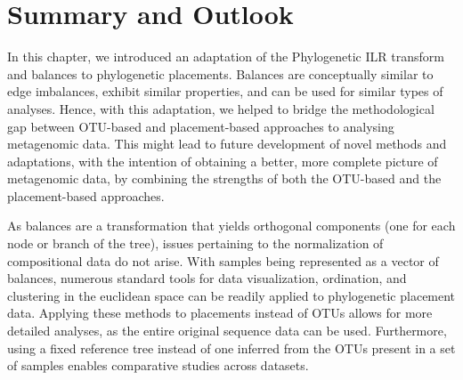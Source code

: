 
\section{Summary and Outlook}
\label{ch:Balances:sec:SummaryOutlook}

In this chapter, we introduced an adaptation of the Phylogenetic ILR transform and balances \cite{Silverman2017}
to phylogenetic placements.
Balances are conceptually similar to edge imbalances, exhibit similar properties, 
and can be used for similar types of analyses.
Hence, with this adaptation, we helped to bridge the methodological gap
between OTU-based and placement-based approaches to analysing metagenomic data.
This might lead to future development of novel methods and adaptations,
with the intention of obtaining a better, more complete picture of metagenomic data,
by combining the strengths of both the OTU-based and the placement-based approaches.

As balances are a transformation that yields orthogonal components (one for each node or branch of the tree),
issues pertaining to the normalization of compositional data do not arise.
With samples being represented as a vector of balances,
numerous standard tools for data visualization, ordination, and clustering in the euclidean space
can be readily applied to phylogenetic placement data.
Applying these methods to placements instead of OTUs allows for more detailed analyses,
as the entire original sequence data can be used.
Furthermore, using a fixed reference tree instead of one inferred from the OTUs present in a set of samples
enables comparative studies across datasets.


